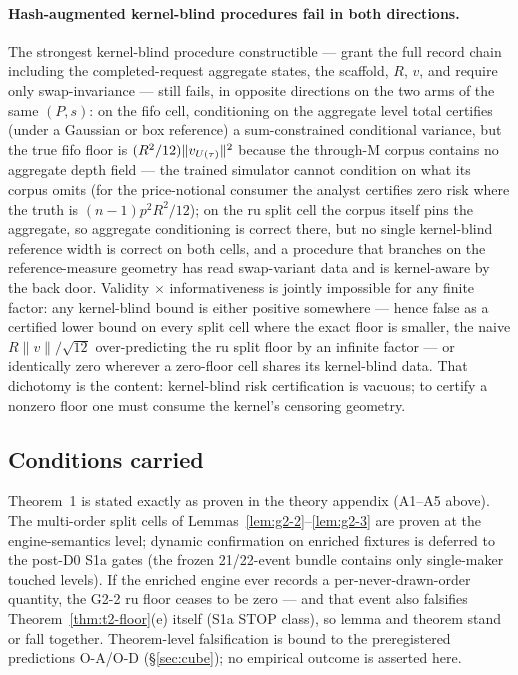 \paragraph{Hash-augmented kernel-blind procedures fail in both directions.}
The strongest kernel-blind procedure constructible --- grant the full record
chain including the completed-request aggregate states, the scaffold, $R$,
$v$, and require only swap-invariance --- still fails, in opposite
directions on the two arms of the same $(P,s)$: on the fifo cell,
conditioning on the aggregate level total certifies (under a Gaussian or
box reference) a sum-constrained conditional variance, but the true fifo
floor is $(R^2/12)\|v_{U(\tau)}\|^2$ because the through-M corpus contains no
aggregate depth field --- the trained simulator cannot condition on what its
corpus omits (for the price-notional consumer the analyst certifies zero
risk where the truth is $(n-1)p^2R^2/12$); on the ru split cell the corpus
itself pins the aggregate, so aggregate conditioning is correct there, but
no single kernel-blind reference width is correct on both cells, and a
procedure that branches on the reference-measure geometry has read
swap-variant data and is kernel-aware by the back door. Validity $\times$
informativeness is jointly impossible for any finite factor: any kernel-blind
bound is either positive somewhere --- hence false as a certified lower bound
on every split cell where the exact floor is smaller, the naive
$R\|v\|/\sqrt{12}$ over-predicting the ru split floor by an infinite factor
--- or identically zero wherever a zero-floor cell shares its kernel-blind
data. That dichotomy is the content: kernel-blind risk certification is
vacuous; to certify a nonzero floor one must consume the kernel's censoring
geometry.

\subsection{Conditions carried}
\label{sec:t2-conditions}

Theorem~1 is stated exactly as proven in the theory appendix (A1--A5 above).
The multi-order split cells of Lemmas~\ref{lem:g2-2}--\ref{lem:g2-3} are
proven at the engine-semantics level; dynamic confirmation on enriched
fixtures is deferred to the post-D0 S1a gates (the frozen 21/22-event bundle
contains only single-maker touched levels). If the enriched engine ever
records a per-never-drawn-order quantity, the G2-2 ru floor ceases to be
zero --- and that event also falsifies Theorem~\ref{thm:t2-floor}(e) itself
(S1a STOP class), so lemma and theorem stand or fall together. Theorem-level
falsification is bound to the preregistered predictions O-A/O-D
(\S\ref{sec:cube}); no empirical outcome is asserted here. \RESULTSPENDING{}
